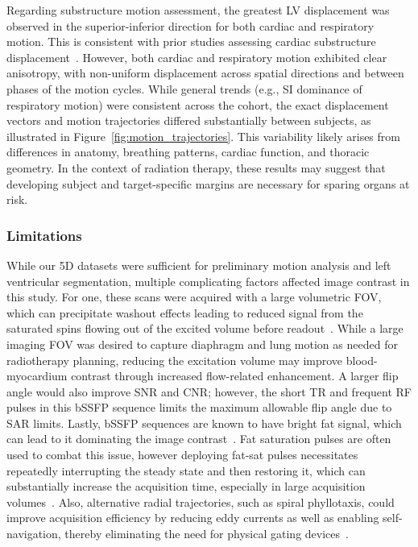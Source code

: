 Regarding substructure motion assessment, the greatest LV displacement was observed in the superior-inferior direction for both cardiac and respiratory motion. This is consistent with prior studies assessing cardiac substructure displacement~\cite{tanEstimationDisplacementCardiac2013, wangMotionAnalysisCardiac2025}. However, both cardiac and respiratory motion exhibited clear anisotropy, with non-uniform displacement across spatial directions and between phases of the motion cycles. While general trends (e.g., SI dominance of respiratory motion) were consistent across the cohort, the exact displacement vectors and motion trajectories differed substantially between subjects, as illustrated in Figure~\ref{fig:motion_trajectories}. This variability likely arises from differences in anatomy, breathing patterns, cardiac function, and thoracic geometry. In the context of radiation therapy, these results may suggest that developing subject and target-specific margins are necessary for sparing organs at risk.

\subsubsection{Limitations}
While our 5D datasets were sufficient for preliminary motion analysis and left ventricular segmentation, multiple complicating factors affected image contrast in this study. For one, these scans were acquired with a large volumetric FOV, which can precipitate washout effects leading to reduced signal from the saturated spins flowing out of the excited volume before readout~\cite{axelBloodFlowEffects1984}. While a large imaging FOV was desired to capture diaphragm and lung motion as needed for radiotherapy planning, reducing the excitation volume may improve blood-myocardium contrast through increased flow-related enhancement. A larger flip angle would also improve SNR and CNR\@; however, the short TR and frequent RF pulses in this bSSFP sequence limits the maximum allowable flip angle due to SAR limits. Lastly, bSSFP sequences are known to have bright fat signal, which can lead to it dominating the image contrast~\cite{bieriFundamentalsBalancedSteady2013}. Fat saturation pulses are often used to combat this issue, however deploying fat-sat pulses necessitates repeatedly interrupting the steady state and then restoring it, which can substantially increase the acquisition time, especially in large acquisition volumes~\cite{fengGoldenAngleRadialMRI2022}. Also, alternative radial trajectories, such as spiral phyllotaxis, could improve acquisition efficiency by reducing eddy currents as well as enabling self-navigation, thereby eliminating the need for physical gating devices~\cite{picciniSpiralPhyllotaxisNatural2011}. 

